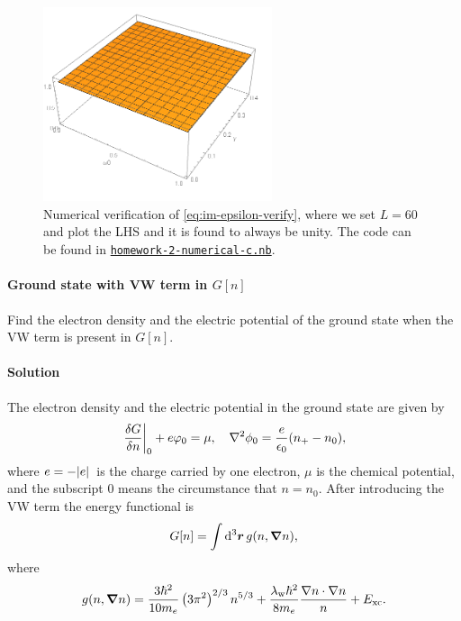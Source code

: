 \documentclass[hyperref, a4paper]{article}
\begin{document}
\begin{figure}
    \centering
    \includegraphics[width=0.6\textwidth]{sum-rule-im-epsilon.PNG}
    \caption{Numerical verification of \eqref{eq:im-epsilon-verify}, where we set $L=60$ and plot the LHS and it is found to always be unity. The code can be found in \href{./homework-2-numerical-c.nb}{\texttt{homework-2-numerical-c.nb}}.}
    \label{fig:im-epsilon-plot}
\end{figure}

\paragraph{}

\paragraph{Ground state with VW term in $G[n]$} Find the electron density and the electric potential of the ground state when the VW term is present in $G[n]$.

\paragraph{Solution} The electron density and the electric potential in the ground state are given by 
\begin{equation}
    \eval{\fdv{G}{n}}_0 + e \varphi_0 = \mu, \quad \laplacian \phi_0 = \frac{e}{\epsilon_0} (n_+ - n_0),
\end{equation}
where $e = - \abs*{e}$ is the charge carried by one electron, $\mu$ is the chemical potential, and the subscript 0 means the circumstance that $n = n_0$.
After introducing the VW term the energy functional is 
\begin{equation}
    G[n] = \int \dd[3]{\vb*{r}} g(n, \grad{n}), 
\end{equation}
where 
\begin{equation}
    g(n, \grad{n}) = \frac{3 \hbar^{2}}{10 m_{e}}\left(3 \pi^{2}\right)^{2 / 3} n^{5 / 3}+\frac{\lambda_{\mathrm{w}} \hbar^{2}}{8 m_{e}} \frac{\nabla n \cdot \nabla n}{n}+E_{\mathrm{xc}}.
\end{equation}
\end{document}
